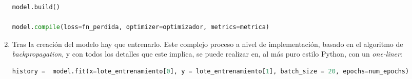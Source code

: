 \begin{enumerate}
\begin{lstlisting}[language=Python]
model.build()

model.compile(loss=fn_perdida, optimizer=optimizador, metrics=metrica)
\end{lstlisting}

    \item Tras la creación del modelo hay que entrenarlo. Este complejo proceso a nivel de implementación, basado en el algoritmo de \textit{backpropagation}, y con todos los detalles que este implica, se puede realizar en, al más puro estilo Python, con un \textit{one-liner}:\medskip
\begin{lstlisting}[language=Python]
history =  model.fit(x=lote_entrenamiento[0], y = lote_entrenamiento[1], batch_size = 20, epochs=num_epochs)
\end{lstlisting}
\end{enumerate}

